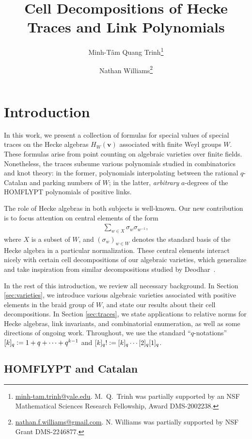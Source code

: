 \documentclass[submission]{FPSAC2025}
\title{Cell Decompositions of Hecke Traces and Link Polynomials}
\author{Minh-T\^{a}m Quang Trinh\thanks{\href{mailto:minh-tam.trinh@yale.edu}{minh-tam.trinh@yale.edu}. M.\ Q.\ Trinh was partially supported by an NSF Mathematical Sciences Research Fellowship, Award DMS-2002238.}\addressmark{1} \and Nathan Williams\thanks{\href{mailto:nathan.f.williams@gmail.com}{nathan.f.williams@gmail.com}. N. Williams was partially supported by NSF Grant DMS-2246877.}\addressmark{2}}
\newcommand{\x}{\mathbf{v}}
\begin{document}
\maketitle

\section{Introduction}

In this work, we present a collection of formulas for special values of special traces on the Hecke algebras $H_W(\x)$ associated with finite Weyl groups $W$.
These formulas arise from point counting on algebraic varieties over finite fields.
Nonetheless, the traces subsume various polynomials studied in combinatorics and knot theory: in the former, polynomials interpolating between the rational $q$-Catalan and parking numbers of $W$; in the latter, \emph{arbitrary} $a$-degrees of the HOMFLYPT polynomials of positive links.

The role of Hecke algebras in both subjects is well-known.
Our new contribution is to focus attention on central elements of the form
\begin{align}
\sum_{w \in X} \sigma_w \sigma_{w^{-1}},
\end{align}
where $X$ is a subset of $W$, and $(\sigma_w)_{w \in W}$ denotes the standard basis of the Hecke algebra in a particular normalization.
These central elements interact nicely with certain cell decompositions of our algebraic varieties, which generalize and take inspiration from similar decompositions studied by Deodhar~\cite{deodhar}.

In the rest of this introduction, we review all necessary background.
In Section \ref{sec:varieties}, we introduce various algebraic varieties associated with positive elements in the braid group of $W$, and state our results about their cell decompositions.
In Section \ref{sec:traces}, we state applications to relative norms for Hecke algebras, link invariants, and combinatorial enumeration, as well as some directions of ongoing work.
Throughout, we use the standard ``$q$-notations'' $[k]_q \vcentcolon= 1 + q + \cdots + q^{k - 1}$ and $[k]_q! \vcentcolon= [k]_q \cdots [2]_q[1]_q$.

\subsection{HOMFLYPT and Catalan}
\end{document}
